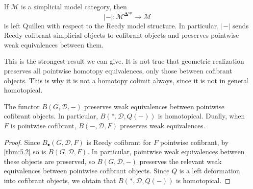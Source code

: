 \begin{theorem}\label{thm:5.2}
	If $\mathcal{M} $ is a simplicial model category, then
	\[
		\left| - \right| : \mathcal{M} ^{\boldsymbol{\Delta} ^{\mathrm{op}} }  \to \mathcal{M} 
	\]
	is left Quillen with respect to the Reedy model structure. In particular, $\left| - \right| $ sends Reedy cofibrant simplicial objects to cofibrant objects and preserves pointwise weak equivalences between them.
\end{theorem}

\begin{remark}
	This is the strongest result we can give. It is not true that geometric realization preserves all pointwise homotopy equivalences, only those between cofibrant objects. This is why it is not a homotopy colimit always, since it is not in general homotopical.
\end{remark}

\begin{corollary}\label{cor:5.2}
	The functor $B(G,\mathcal{D} ,-)$ preserves weak equivalences between pointwise cofibrant objects. In particular, $B(*,\mathcal{D} ,Q(-))$ is homotopical. Dually, when $F$ is pointwise cofibrant, $B(-,\mathcal{D} ,F)$ preserves weak equivalences.
\end{corollary}
\begin{proof}
	Since $B_{\bullet} (G,\mathcal{D},F)$ is Reedy cofibrant for $F$ pointwise cofibrant, by \cref{thm:5.2} so is $B(G,\mathcal{D} ,F)$. In particular, pointwise weak equivalences between these objects are preserved, so $B(G,\mathcal{D} ,-)$ preserves the relevant weak equivalences between pointwise cofibrant objects. Since $Q$ is a left deformation into cofibrant objects, we obtain that $B(*,\mathcal{D} ,Q(-))$ is homotopical.
\end{proof}

